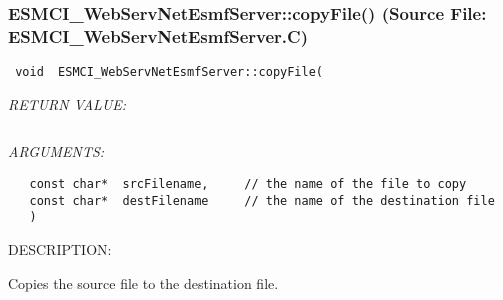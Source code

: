 \subsubsection{ESMCI\_WebServNetEsmfServer::copyFile() (Source File: ESMCI\_WebServNetEsmfServer.C)}


  
\begin{verbatim} void  ESMCI_WebServNetEsmfServer::copyFile(\end{verbatim}{\em RETURN VALUE:}
\begin{verbatim} \end{verbatim}{\em ARGUMENTS:}
\begin{verbatim}   const char*  srcFilename,     // the name of the file to copy
   const char*  destFilename     // the name of the destination file
   )\end{verbatim}
{\sf DESCRIPTION:\\ }


      Copies the source file to the destination file.
  
\setlength{\parskip}{\oldparskip}
\setlength{\parindent}{\oldparindent}
\setlength{\baselineskip}{\oldbaselineskip}
